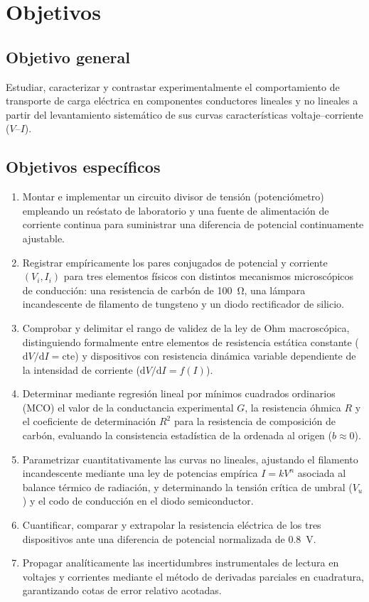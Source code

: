 
\section{Objetivos}
\label{sec:objetivos}

\subsection{Objetivo general}
Estudiar, caracterizar y contrastar experimentalmente el comportamiento de transporte de carga eléctrica en componentes conductores lineales y no lineales a partir del levantamiento sistemático de sus curvas características voltaje--corriente ($V$--$I$).

\subsection{Objetivos específicos}
\begin{enumerate}
    \item Montar e implementar un circuito divisor de tensión (potenciómetro) empleando un reóstato de laboratorio y una fuente de alimentación de corriente continua para suministrar una diferencia de potencial continuamente ajustable.
    \item Registrar empíricamente los pares conjugados de potencial y corriente $(V_i, I_i)$ para tres elementos físicos con distintos mecanismos microscópicos de conducción: una resistencia de carbón de \qty{100}{\ohm}, una lámpara incandescente de filamento de tungsteno y un diodo rectificador de silicio.
    \item Comprobar y delimitar el rango de validez de la ley de Ohm macroscópica, distinguiendo formalmente entre elementos de resistencia estática constante ($\mathrm{d}V/\mathrm{d}I = \text{cte}$) y dispositivos con resistencia dinámica variable dependiente de la intensidad de corriente ($\mathrm{d}V/\mathrm{d}I = f(I)$).
    \item Determinar mediante regresión lineal por mínimos cuadrados ordinarios (MCO) el valor de la conductancia experimental $G$, la resistencia óhmica $R$ y el coeficiente de determinación $R^2$ para la resistencia de composición de carbón, evaluando la consistencia estadística de la ordenada al origen ($b \approx 0$).
    \item Parametrizar cuantitativamente las curvas no lineales, ajustando el filamento incandescente mediante una ley de potencias empírica $I = k V^n$ asociada al balance térmico de radiación, y determinando la tensión crítica de umbral ($V_u$) y el codo de conducción en el diodo semiconductor.
    \item Cuantificar, comparar y extrapolar la resistencia eléctrica de los tres dispositivos ante una diferencia de potencial normalizada de \qty{0,8}{\volt}.
    \item Propagar analíticamente las incertidumbres instrumentales de lectura en voltajes y corrientes mediante el método de derivadas parciales en cuadratura, garantizando cotas de error relativo acotadas.
\end{enumerate}
